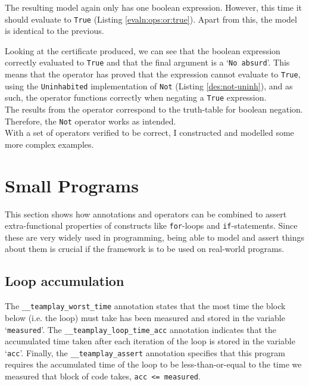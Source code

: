         The resulting \Idris model again only has one boolean expression. However, this time it should evaluate to \texttt{True} (Listing \ref{evaln:ops:or:true}). Apart from this, the model is identical to the previous.
        
        
        Looking at the certificate produced, we can see that the boolean expression correctly evaluated to \texttt{True} and that the final argument is a `\texttt{No absurd}'. This means that the operator has proved that the expression cannot evaluate to \texttt{True}, using the \texttt{Uninhabited} implementation of \texttt{Not} (Listing \ref{des:not-uninh}), and as such, the operator functions correctly when negating a \texttt{True} expression.
        \\
        
        The results from the operator correspond to the truth-table for boolean negation. Therefore, the \texttt{Not} operator works as intended.
        \\
        
        With a set of operators verified to be correct, I constructed and modelled some more complex examples.

\newpage


\section{Small Programs}\label{evaln:small-progs}
    This section shows how annotations and operators can be combined to assert extra-functional properties of constructs like \texttt{for}-loops and \texttt{if}-statements. Since these are very widely used in programming, being able to model and assert things about them is crucial if the framework is to be used on real-world programs.
    \subsection{Loop accumulation}\label{evaln:progs:loop}
        
        
        The \texttt{\_\_teamplay\_worst\_time} annotation states that the most time the block below (i.e. the loop) must take has been measured and stored in the variable `\texttt{measured}'. The \texttt{\_\_teamplay\_loop\_time\_acc} annotation indicates that the accumulated time taken after each iteration of the loop is stored in the variable `\texttt{acc}'. Finally, the \texttt{\_\_teamplay\_assert} annotation specifies that this program requires the accumulated time of the loop to be less-than-or-equal to the time we measured that block of code takes, \texttt{acc <= measured}.
        
